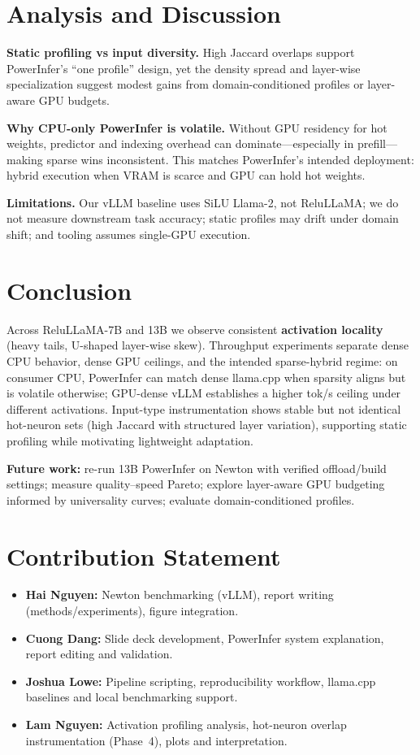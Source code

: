 \documentclass{article}
\begin{document}
\section{Analysis and Discussion}
\textbf{Static profiling vs input diversity.} High Jaccard overlaps support PowerInfer's ``one profile'' design, yet the density spread and layer-wise specialization suggest modest gains from domain-conditioned profiles or layer-aware GPU budgets.

\textbf{Why CPU-only PowerInfer is volatile.} Without GPU residency for hot weights, predictor and indexing overhead can dominate---especially in prefill---making sparse wins inconsistent. This matches PowerInfer's intended deployment: hybrid execution when VRAM is scarce and GPU can hold hot weights.

\textbf{Limitations.} Our vLLM baseline uses SiLU Llama-2, not ReluLLaMA; we do not measure downstream task accuracy; static profiles may drift under domain shift; and tooling assumes single-GPU execution.

\section{Conclusion}
Across ReluLLaMA-7B and 13B we observe consistent \textbf{activation locality} (heavy tails, U-shaped layer-wise skew). Throughput experiments separate dense CPU behavior, dense GPU ceilings, and the intended sparse-hybrid regime: on consumer CPU, PowerInfer can match dense llama.cpp when sparsity aligns but is volatile otherwise; GPU-dense vLLM establishes a higher tok/s ceiling under different activations. Input-type instrumentation shows stable but not identical hot-neuron sets (high Jaccard with structured layer variation), supporting static profiling while motivating lightweight adaptation.

\textbf{Future work:} re-run 13B PowerInfer on Newton with verified offload/build settings; measure quality--speed Pareto; explore layer-aware GPU budgeting informed by universality curves; evaluate domain-conditioned profiles.

\section*{Contribution Statement}
\begin{itemize}
  \item \textbf{Hai Nguyen:} Newton benchmarking (vLLM), report writing (methods/experiments), figure integration.
  \item \textbf{Cuong Dang:} Slide deck development, PowerInfer system explanation, report editing and validation.
  \item \textbf{Joshua Lowe:} Pipeline scripting, reproducibility workflow, llama.cpp baselines and local benchmarking support.
  \item \textbf{Lam Nguyen:} Activation profiling analysis, hot-neuron overlap instrumentation (Phase~4), plots and interpretation.
\end{itemize}

% 


\end{document}
